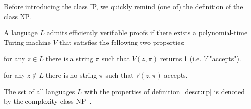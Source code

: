 
Before introducing the class IP, we quickly remind (one of) the definition of the class NP.

\begin{defn}
    A language $L$ admits efficiently verifiable proofs if there exists a polynomial-time Turing machine $V$ that satisfies the following two properties: 
    \begin{description}\label{descr:np}
        \item[Completeness: ]for any $z \in L$ there is a string $\pi$ such that $V(z, \pi)$ returns 1 (i.e. $V$ "accepts").
        \item[Soundness: ]for any $z \notin L$ there is no string $\pi$ such that $V(z, \pi)$ accepts. 
    \end{description}
\end{defn}

\begin{defn}
    The set of all languages $L$ with the properties of definition~\ref{descr:np} is denoted by the complexity class NP~\cite{randomness}.
\end{defn}


